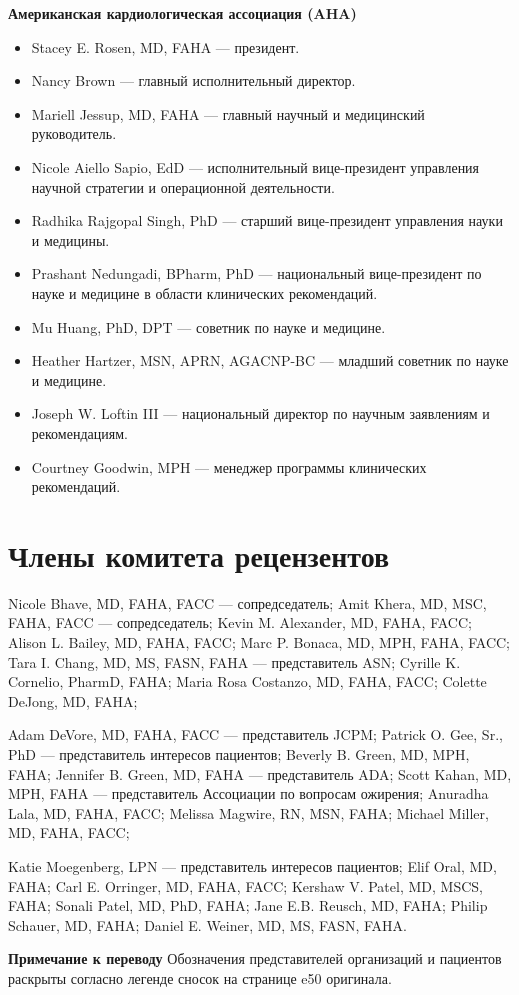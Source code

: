 \documentclass[11pt,a4paper]{article}
\newcommand{\editorial}[1]{\par\begingroup\small\color{black!70}\textbf{Примечание к переводу} #1\par\endgroup}
\newcommand{\heading}[1]{\par\medskip\textbf{#1}\par}
\begin{document}
\heading{Американская кардиологическая ассоциация (AHA)}
\begin{itemize}
\item Stacey E. Rosen, MD, FAHA --- президент.
\item Nancy Brown --- главный исполнительный директор.
\item Mariell Jessup, MD, FAHA --- главный научный и медицинский руководитель.
\item Nicole Aiello Sapio, EdD --- исполнительный вице-президент управления научной стратегии и операционной деятельности.
\item Radhika Rajgopal Singh, PhD --- старший вице-президент управления науки и медицины.
\item Prashant Nedungadi, BPharm, PhD --- национальный вице-президент по науке и медицине в области клинических рекомендаций.
\item Mu Huang, PhD, DPT --- советник по науке и медицине.
\item Heather Hartzer, MSN, APRN, AGACNP-BC --- младший советник по науке и медицине.
\item Joseph W. Loftin III --- национальный директор по научным заявлениям и рекомендациям.
\item Courtney Goodwin, MPH --- менеджер программы клинических рекомендаций.
\end{itemize}

\section*{Члены комитета рецензентов}
{\small
Nicole Bhave, MD, FAHA, FACC --- сопредседатель; Amit Khera, MD, MSC, FAHA, FACC --- сопредседатель; Kevin M. Alexander, MD, FAHA, FACC; Alison L. Bailey, MD, FAHA, FACC; Marc P. Bonaca, MD, MPH, FAHA, FACC; Tara I. Chang, MD, MS, FASN, FAHA --- представитель ASN; Cyrille K. Cornelio, PharmD, FAHA; Maria Rosa Costanzo, MD, FAHA, FACC; Colette DeJong, MD, FAHA;

Adam DeVore, MD, FAHA, FACC --- представитель JCPM; Patrick O. Gee, Sr., PhD --- представитель интересов пациентов; Beverly B. Green, MD, MPH, FAHA; Jennifer B. Green, MD, FAHA --- представитель ADA; Scott Kahan, MD, MPH, FAHA --- представитель Ассоциации по вопросам ожирения; Anuradha Lala, MD, FAHA, FACC; Melissa Magwire, RN, MSN, FAHA; Michael Miller, MD, FAHA, FACC;

Katie Moegenberg, LPN --- представитель интересов пациентов; Elif Oral, MD, FAHA; Carl E. Orringer, MD, FAHA, FACC; Kershaw V. Patel, MD, MSCS, FAHA; Sonali Patel, MD, PhD, FAHA; Jane E.B. Reusch, MD, FAHA; Philip Schauer, MD, FAHA; Daniel E. Weiner, MD, MS, FASN, FAHA.
}
\editorial{Обозначения представителей организаций и пациентов раскрыты согласно легенде сносок на странице e50 оригинала.}
\end{document}
